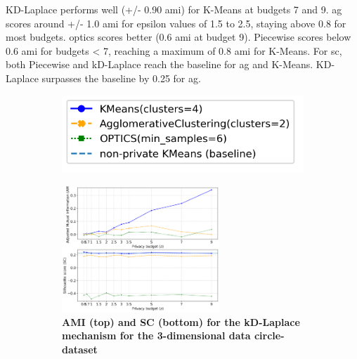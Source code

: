 \begin{figure}[H]
\begin{subfigure}{1\textwidth}
      \end{subfigure}
      \label{fig:validation-heart-dataset_comparison_3d-laplace}
\end{figure}
KD-Laplace performs well (+/- 0.90 \gls{ami}) for K-Means at budgets 7 and 9.
\gls{ag} scores around +/- 1.0 \gls{ami} for epsilon values of 1.5 to 2.5, staying above 0.8 for most budgets.
\gls{optics} scores better (0.6 \gls{ami} at budget 9).
Piecewise scores below 0.6 \gls{ami} for budgets < 7, reaching a maximum of 0.8 \gls{ami} for K-Means.
For \gls{sc}, both Piecewise and kD-Laplace reach the baseline for \gls{ag} and K-Means.
KD-Laplace surpasses the baseline by 0.25 for \gls{ag}.
\newpage
\begin{figure}[H]
      \centering
      \begin{subfigure}{0.3\textwidth}
            \includegraphics[width=\textwidth]{Results/kd-laplace/kd-Laplace/circle-dataset/legend_3.png}
      \end{subfigure}
      \begin{subfigure}{1\textwidth}
            \caption{\textbf{AMI (top) and SC (bottom) for the kD-Laplace mechanism for the 3-dimensional data circle-dataset}}
            \centering
            \includegraphics[width=0.65\textwidth]{Results/kd-laplace/kd-Laplace/circle-dataset/ami-and-sc_3_dimensions.png}
            \centering
      \end{subfigure}
      \begin{subfigure}{1\textwidth}

\end{subfigure}
\end{figure}
